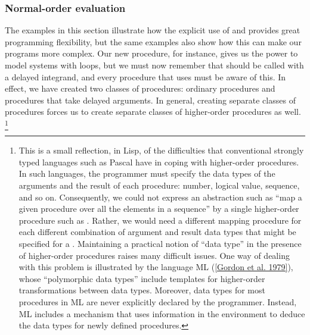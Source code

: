 \subsubsection*{Normal-order evaluation}

The examples in this section illustrate how the explicit use of  and  provides great programming flexibility, but the same examples also show how this can make our programs more complex.
Our new  procedure, for instance, gives us the power to model systems with loops, but we must now remember that  should be called with a delayed integrand, and every procedure that uses  must be aware of this.
In effect, we have created two classes of procedures:
ordinary procedures and procedures that take delayed arguments.
In general, creating separate classes of procedures forces us to create separate classes of higher-order procedures as well.%
\footnote{
	This is a small reflection, in Lisp, of the difficulties that conventional strongly typed languages such as Pascal have in coping with higher-order procedures.
	In such languages, the programmer must specify the data types of the arguments and the result of each procedure:
	number, logical value, sequence, and so on.
	Consequently, we could not express an abstraction such as “map a given procedure  over all the elements in a sequence” by a single higher-order procedure such as .
	Rather, we would need a different mapping procedure for each different combination of argument and result data types that might be specified for a .
	Maintaining a practical notion of “data type” in the presence of higher-order procedures raises many difficult issues.
	One way of dealing with this problem is illustrated by the language ML (\cref{Gordon et al. 1979}), whose “polymorphic data types” include templates for higher-order transformations between data types.
	Moreover, data types for most procedures in ML are never explicitly declared by the programmer.
	Instead, ML includes a  mechanism that uses information in the environment to deduce the data types for newly defined procedures.
}

